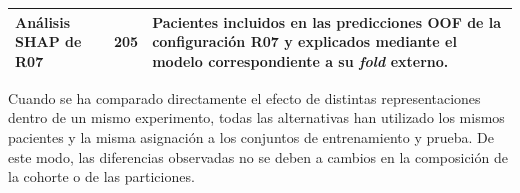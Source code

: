 \begin{table}[!htbp]
\begin{tabularx}{\textwidth}{p{4.0cm}cX}
Análisis SHAP de R07
& 205
& Pacientes incluidos en las predicciones OOF de la configuración R07 y explicados mediante el modelo correspondiente a su \textit{fold} externo. \\

\bottomrule
\end{tabularx}
\end{table}

Cuando se ha comparado directamente el efecto de distintas representaciones dentro de un mismo experimento, todas las alternativas han utilizado los mismos pacientes y la misma asignación a los conjuntos de entrenamiento y prueba. De este modo, las diferencias observadas no se deben a cambios en la composición de la cohorte o de las particiones. 
